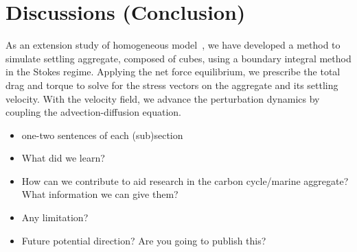 \section{Discussions (Conclusion)}
As an extension study of homogeneous model~\cite{yoo_hydrodynamic_2020}, we have developed a method to simulate settling aggregate, composed of cubes, using a boundary integral method in the Stokes regime.
Applying the net force equilibrium, we prescribe the total drag and torque to solve for the stress vectors on the aggregate and its settling velocity. 
With the velocity field, we advance the perturbation dynamics by coupling the advection-diffusion equation.
\begin{itemize}
	\item one-two sentences of each (sub)section
	\item What did we learn?
	\item How can we contribute to aid research in the carbon cycle/marine aggregate? What information we can give them?
	\item Any limitation?
	\item Future potential direction? Are you going to publish this? 
\end{itemize}

